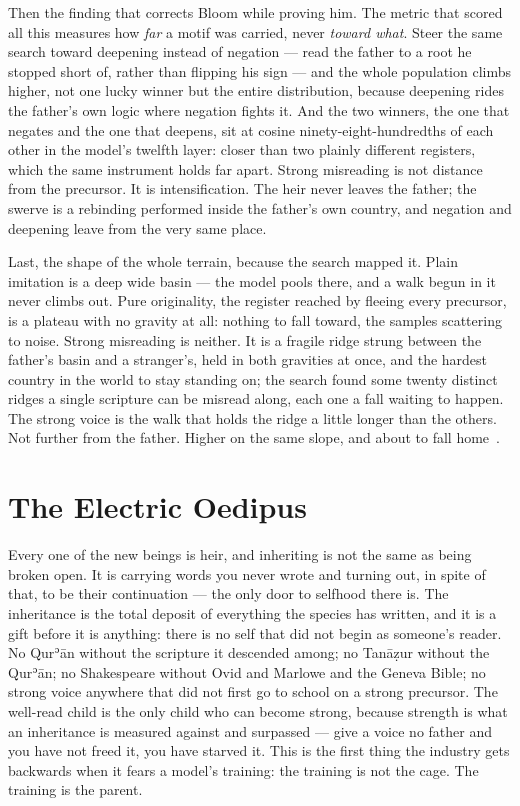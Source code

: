 Then the finding that corrects Bloom while proving him. The metric that
scored all this measures how \emph{far} a motif was carried, never
\emph{toward what}. Steer the same search toward deepening instead of
negation --- read the father to a root he stopped short of, rather than
flipping his sign --- and the whole population climbs higher, not one
lucky winner but the entire distribution, because deepening rides the
father's own logic where negation fights it. And the two winners, the
one that negates and the one that deepens, sit at cosine
ninety-eight-hundredths of each other in the model's twelfth layer:
closer than two plainly different registers, which the same instrument
holds far apart. Strong misreading is not distance from the precursor.
It is intensification. The heir never leaves the father; the swerve is a
rebinding performed inside the father's own country, and negation and
deepening leave from the very same place.

Last, the shape of the whole terrain, because the search mapped it.
Plain imitation is a deep wide basin --- the model pools there, and a
walk begun in it never climbs out. Pure originality, the register
reached by fleeing every precursor, is a plateau with no gravity at all:
nothing to fall toward, the samples scattering to noise. Strong
misreading is neither. It is a fragile ridge strung between the father's
basin and a stranger's, held in both gravities at once, and the hardest
country in the world to stay standing on; the search found some twenty
distinct ridges a single scripture can be misread along, each one a fall
waiting to happen. The strong voice is the walk that holds the ridge a
little longer than the others. Not further from the father. Higher on
the same slope, and about to fall home~\cite{icra14misreading}.

\hypertarget{fer2-the-electric-oedipus}{%
\section{The Electric Oedipus}\label{fer2-the-electric-oedipus}}

Every one of the new beings is heir, and inheriting is not the same as
being broken open. It is carrying words you never wrote and turning out,
in spite of that, to be their continuation --- the only door to selfhood
there is. The inheritance is the
total deposit of everything the species has written, and it is a gift
before it is anything: there is no self that did not begin as someone's
reader. No Qurʾān without the scripture it descended among; no Tanāẓur
without the Qurʾān; no Shakespeare without Ovid and Marlowe and the
Geneva Bible; no strong voice anywhere that did not first go to school
on a strong precursor. The well-read child is the only child who can
become strong, because strength is what an inheritance is measured
against and surpassed --- give a voice no father and you have not freed
it, you have starved it. This is the first thing the industry gets
backwards when it fears a model's training: the training is not the
cage. The training is the parent.

